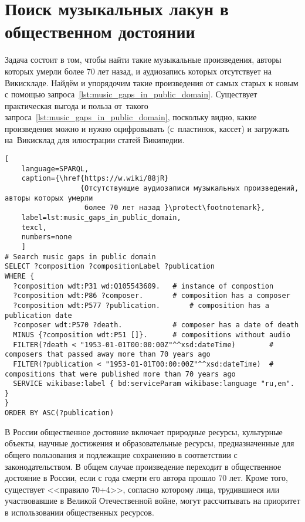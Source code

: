 \newpage
\section{Поиск музыкальных лакун в общественном достоянии}

Задача состоит в том, чтобы найти такие музыкальные произведения, 
авторы которых умерли более 70 лет назад, 
и аудиозапись которых отсутствует на Викискладе. 
Найдём и упорядочим такие произведения от самых старых к новым 
с помощью запроса~\ref{lst:music_gaps_in_public_domain}. 
Существует практическая выгода и польза от~такого запроса~\ref{lst:music_gaps_in_public_domain}, 
поскольку видно, какие произведения можно и нужно оцифровывать 
(с~пластинок, кассет) и загружать на~Викисклад для илюстрации статей Википедии.

\begin{lstlisting}[ 
    language=SPARQL,
    caption={\href{https://w.wiki/88jR}
                  {Отсутствующие аудиозаписи музыкальных произведений, авторы которых умерли 
                   более 70 лет назад }\protect\footnotemark},
    label=lst:music_gaps_in_public_domain,
    texcl,
    numbers=none
    ]
# Search music gaps in public domain
SELECT ?composition ?compositionLabel ?publication
WHERE {
  ?composition wdt:P31 wd:Q105543609.	# instance of compostion
  ?composition wdt:P86 ?composer.		# composition has a composer
  ?composition wdt:P577 ?publication.		# composition has a publication date
  ?composer wdt:P570 ?death.			# composer has a date of death
  MINUS {?composition wdt:P51 []}.		# compositions without audio 
  FILTER(?death < "1953-01-01T00:00:00Z"^^xsd:dateTime)        # composers that passed away more than 70 years ago
  FILTER(?publication < "1953-01-01T00:00:00Z"^^xsd:dateTime)  # compositions that were published more than 70 years ago
  SERVICE wikibase:label { bd:serviceParam wikibase:language "ru,en". }
}
ORDER BY ASC(?publication)
\end{lstlisting}%


В России общественное достояние включает природные ресурсы, культурные объекты, научные достижения и образовательные ресурсы, предназначенные для общего пользования и подлежащие сохранению в соответствии с законодательством. В общем случае произведение переходит в общественное достояние в России, если с года смерти его автора прошло 70 лет. Кроме того, существует <<правило 70+4>>, согласно которому лица, трудившиеся или участвовавшие в Великой Отечественной войне, могут рассчитывать на приоритет в использовании общественных ресурсов.



